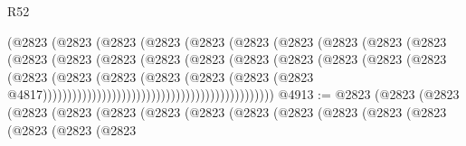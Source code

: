 \begin{lexlean}{R52}
\begin{coremodule}
                                            (@2823
                                              (@2823
                                                (@2823
                                                  (@2823
                                                    (@2823
                                                      (@2823
                                                        (@2823
                                                          (@2823
                                                            (@2823
                                                              (@2823
                                                                (@2823
                                                                  (@2823
                                                                    (@2823
                                                                      (@2823
                                                                        (@2823
                                                                          (@2823
                                                                            (@2823
                                                                              (@2823
                                                                                (@2823
                                                                                  (@2823
                                                                                    (@2823
                                                                                      (@2823
                                                                                        (@2823
                                                                                          (@2823
                                                                                            (@2823
                                                                                              (@2823
                                                                                                (@2823
                                                                                                  @4817)))))))))))))))))))))))))))))))))))))))))))))))
@4913 := @2823
    (@2823
      (@2823
        (@2823
          (@2823
            (@2823
              (@2823
                (@2823
                  (@2823
                    (@2823
                      (@2823
                        (@2823
                          (@2823
                            (@2823
                              (@2823
                                (@2823

\end{coremodule}
\end{lexlean}

